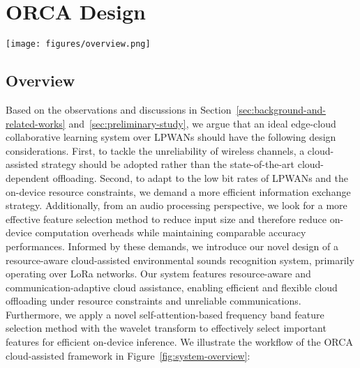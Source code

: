 \section{ORCA Design}
\label{sec:system-design}

\begin{figure*}[tp]
    \centering
    \texttt{[image: figures/overview.png]}
    \vspace{-0.5cm}
    \caption{}
    \vspace{-0.2cm}
    \label{fig:system-overview}
\end{figure*}

\subsection{Overview}
\label{sec:system-overview}
Based on the observations and discussions in Section~\ref{sec:background-and-related-works} and~\ref{sec:preliminary-study}, we argue that an ideal edge-cloud collaborative learning system over LPWANs should have the following design considerations. First, to tackle the unreliability of wireless channels, a cloud-assisted strategy should be adopted rather than the state-of-the-art cloud-dependent offloading. Second, to adapt to the low bit rates of LPWANs and the on-device resource constraints, we demand a more efficient information exchange strategy. Additionally, from an audio processing perspective, we look for a more effective feature selection method to reduce input size and therefore reduce on-device computation overheads while maintaining comparable accuracy performances. Informed by these demands, we introduce our novel design of a resource-aware cloud-assisted environmental sounds recognition system, primarily operating over LoRa networks. Our system features resource-aware and communication-adaptive cloud assistance, enabling efficient and flexible cloud offloading under resource constraints and unreliable communications. Furthermore, we apply a novel self-attention-based frequency band feature selection method with the wavelet transform to effectively select important features for efficient on-device inference. We illustrate the workflow of the ORCA cloud-assisted framework in Figure~\ref{fig:system-overview}:

\noindent
{}

